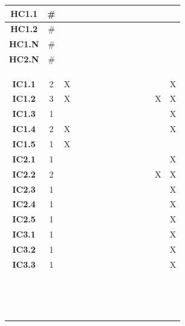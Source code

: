 \documentclass [10pt]{article}
\begin{document}
\begin{center}
\begin{tabularx} {\textwidth} {|c|c|c|c|c|c|c|c|c|c|c|c|c| c|}
 
 \textbf{HC1.1}&\# & & & & & & & & & & & & \\ \hline
 \textbf{HC1.2}&\# & & & & & & & & & & & & \\ \hline
 \textbf{HC1.N}&\# & & & & & & & & & & & & \\ \hline
 \textbf{HC2.N}&\# & & & & & & & & & & & & \\ \hline
 & & & & & & & & & & & & &\\ \hline
 & & & & & & & & & & & & &\\ \hline 
 & & & & & & & & & & & & &\\ \hline
 \textbf{IC1.1}&2 & X & & & & & & & & & & & X \\ \hline
 \textbf{IC1.2}&3&X && & & & & & & & & X & X  \\ \hline 
 \textbf{IC1.3}&1& & & & & & & & & & & & X  \\ \hline 
 \textbf{IC1.4}&2&X & & & & & & & & & & & X  \\ \hline 
 \textbf{IC1.5}&1&X & & & & & & & & & & &   \\ \hline 
 \textbf{IC2.1}&1 & & & & & & & & & & & & X \\ \hline
 \textbf{IC2.2}&2& & & & & & & & & & &X & X  \\ \hline 
 \textbf{IC2.3}&1& & & & & & & & & & & & X  \\ \hline 
 \textbf{IC2.4}&1& & & & & & & & & & & & X  \\ \hline 
 \textbf{IC2.5}&1& & & & & & & & & & & & X  \\ \hline 
 \textbf{IC3.1}&1 & & & & & & & & & & & & X \\ \hline
 \textbf{IC3.2}&1& & & & & & & & & & & & X  \\ \hline 
 \textbf{IC3.3}&1& & & & & & & & & & & & X  \\ \hline 
 & & & & & & & & & & & & &\\ \hline
 & & & & & & & & & & & & &\\ \hline
 & & & & & & & & & & & & &\\ \hline
 & & & & & & & & & & & & &\\ \hline
 & & & & & & & & & & & & &\\ \hline
 & & & & & & & & & & & & &\\ \hline
 & & & & & & & & & & & & &\\ \hline
 & & & & & & & & & & & & &\\ \hline
 & & & & & & & & & & & & &\\ \hline
 & & & & & & & & & & & & &\\ \hline
 & & & & & & & & & & & & &\\ \hline
 & & & & & & & & & & & & &\\ \hline
 & & & & & & & & & & & & &\\ \hline
 & & & & & & & & & & & & &\\ \hline
 & & & & & & & & & & & & &\\ \hline


\end{tabularx}
\end{center}
\end{document}
